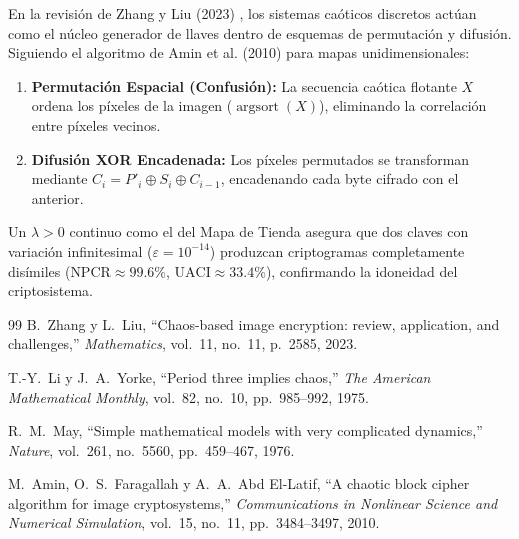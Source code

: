 \documentclass[11pt,letterpaper]{article}
\theoremstyle{definition}
\begin{document}
En la revisión de Zhang y Liu (2023) \cite{zhang2023}, los sistemas caóticos discretos actúan como el núcleo generador de llaves dentro de esquemas de permutación y difusión. Siguiendo el algoritmo de Amin et al. (2010) \cite{amin2010} para mapas unidimensionales:
\begin{enumerate}
    \item \textbf{Permutación Espacial (Confusión):} La secuencia caótica flotante $X$ ordena los píxeles de la imagen ($\operatorname{argsort}(X)$), eliminando la correlación entre píxeles vecinos.
    \item \textbf{Difusión XOR Encadenada:} Los píxeles permutados se transforman mediante $C_i = P'_i \oplus S_i \oplus C_{i-1}$, encadenando cada byte cifrado con el anterior.
\end{enumerate}

Un $\lambda > 0$ continuo como el del Mapa de Tienda asegura que dos claves con variación infinitesimal ($\varepsilon = 10^{-14}$) produzcan criptogramas completamente disímiles ($\text{NPCR} \approx 99.6\%$, $\text{UACI} \approx 33.4\%$), confirmando la idoneidad del criptosistema.

\newpage
\begin{thebibliography}{99}
B.~Zhang y L.~Liu, ``Chaos-based image encryption: review, application, and challenges,'' \textit{Mathematics}, vol.~11, no.~11, p.~2585, 2023.

T.-Y.~Li y J.~A.~Yorke, ``Period three implies chaos,'' \textit{The American Mathematical Monthly}, vol.~82, no.~10, pp.~985--992, 1975.

R.~M.~May, ``Simple mathematical models with very complicated dynamics,'' \textit{Nature}, vol.~261, no.~5560, pp.~459--467, 1976.

M.~Amin, O.~S.~Faragallah y A.~A.~Abd El-Latif, ``A chaotic block cipher algorithm for image cryptosystems,'' \textit{Communications in Nonlinear Science and Numerical Simulation}, vol.~15, no.~11, pp.~3484--3497, 2010.
\end{thebibliography}
\end{document}
